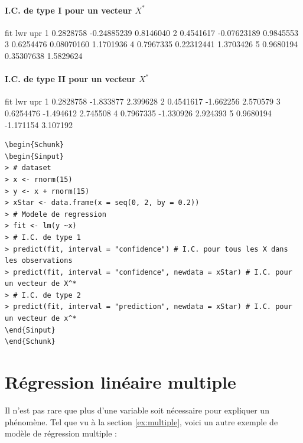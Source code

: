 \documentclass[11pt,french]{report}
\begin{document}
\subsubsection*{I.C. de type I pour un vecteur $X^*$}
\begin{Schunk}
\begin{Soutput}
        fit         lwr       upr
1 0.2828758 -0.24885239 0.8146040
2 0.4541617 -0.07623189 0.9845553
3 0.6254476  0.08070160 1.1701936
4 0.7967335  0.22312441 1.3703426
5 0.9680194  0.35307638 1.5829624
\end{Soutput}
\end{Schunk}

\subsubsection*{I.C. de type II pour un vecteur $X^*$}
\begin{Schunk}
\begin{Soutput}
        fit       lwr      upr
1 0.2828758 -1.833877 2.399628
2 0.4541617 -1.662256 2.570579
3 0.6254476 -1.494612 2.745508
4 0.7967335 -1.330926 2.924393
5 0.9680194 -1.171154 3.107192
\end{Soutput}
\end{Schunk}

\begin{lstlisting}[linerange=\\begin\{Sinput\}-\\end\{Sinput\},includerangemarker=false, caption = Code source en R pour l'exemple]
\begin{Schunk}
\begin{Sinput}
> # dataset
> x <- rnorm(15)
> y <- x + rnorm(15)
> xStar <- data.frame(x = seq(0, 2, by = 0.2)) 
> # Modele de regression
> fit <- lm(y ~x)
> # I.C. de type 1
> predict(fit, interval = "confidence") # I.C. pour tous les X dans les observations
> predict(fit, interval = "confidence", newdata = xStar) # I.C. pour un vecteur de X^*
> # I.C. de type 2
> predict(fit, interval = "prediction", newdata = xStar) # I.C. pour un vecteur de x^*
\end{Sinput}
\end{Schunk}
\end{lstlisting}
\bigskip

\chapter{Régression linéaire multiple}
Il n'est pas rare que plus d'une variable soit nécessaire pour expliquer un phénomène. 
Tel que vu à la section \ref{ex:multiple}, voici un autre exemple de modèle de régression multiple :
\end{document}
